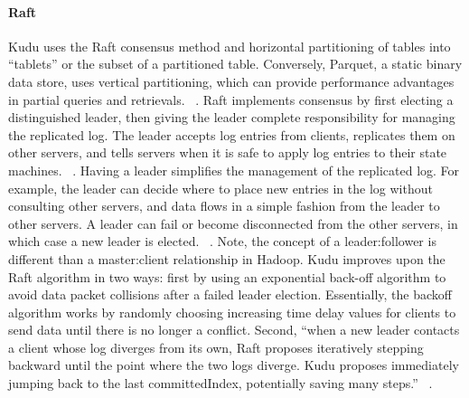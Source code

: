 \paragraph{Raft}
Kudu uses the Raft consensus method and horizontal partitioning of tables into ``tablets'' or the subset of a partitioned table. Conversely, Parquet, a static binary data store, uses vertical partitioning, which can provide performance advantages in partial queries and retrievals. ~\cite{hid-sp18-407-benchmarking-kudu}. Raft implements consensus by first electing a distinguished leader, then giving the leader complete responsibility for managing the replicated log. The leader accepts log entries from clients, replicates them on other servers, and tells servers when it is safe to apply log entries to their state machines. ~\cite{hid-sp18-407-raft-algo}. Having a leader simplifies the management of the replicated log. For example, the leader can decide where to place new entries in the log without consulting other servers, and data flows in a simple fashion from the leader to other servers. A leader can fail or become disconnected from the other servers, in which case a new leader is elected. ~\cite{hid-sp18-407-raft-algo}. Note, the concept of a leader:follower is different than a master:client relationship in Hadoop. Kudu improves upon the Raft algorithm in two ways: first by using an exponential back-off algorithm to avoid data packet collisions after a failed leader election. Essentially, the backoff algorithm works by randomly choosing increasing time delay values for clients to send data until there is no longer a conflict. Second, ``when a new leader contacts a client whose log diverges from its own, Raft proposes iteratively stepping backward until the point where the two logs diverge. Kudu proposes immediately jumping back to the last committedIndex, potentially saving many steps.'' ~\cite{hid-sp18-407-kudu-intro}.

